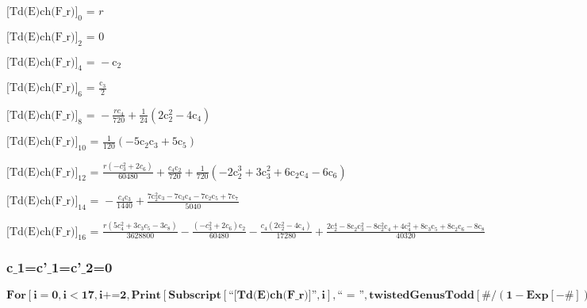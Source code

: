 \documentclass{article}
\newcommand{\unicode}[1]{{}}
\begin{document}
\noindent\(\text{[Td(E)ch(F$\_$r)]}_0\text{ = }r\)

\noindent\(\text{[Td(E)ch(F$\_$r)]}_2\text{ = }0\)

\noindent\(\text{[Td(E)ch(F$\_$r)]}_4\text{ = }-\text{c$\unicode{02bc}$}_2\)

\noindent\(\text{[Td(E)ch(F$\_$r)]}_6\text{ = }\frac{\text{c$\unicode{02bc}$}_3}{2}\)

\noindent\(\text{[Td(E)ch(F$\_$r)]}_8\text{ = }-\frac{r c_4}{720}+\frac{1}{24} \left(2 \text{c$\unicode{02bc}$}_2^2-4 \text{c$\unicode{02bc}$}_4\right)\)

\noindent\(\text{[Td(E)ch(F$\_$r)]}_{10}\text{ = }\frac{1}{120} \left(-5 \text{c$\unicode{02bc}$}_2 \text{c$\unicode{02bc}$}_3+5 \text{c$\unicode{02bc}$}_5\right)\)

\noindent\(\text{[Td(E)ch(F$\_$r)]}_{12}\text{ = }\frac{r \left(-c_3^2+2 c_6\right)}{60480}+\frac{c_4 \text{c$\unicode{02bc}$}_2}{720}+\frac{1}{720}
\left(-2 \text{c$\unicode{02bc}$}_2^3+3 \text{c$\unicode{02bc}$}_3^2+6 \text{c$\unicode{02bc}$}_2 \text{c$\unicode{02bc}$}_4-6 \text{c$\unicode{02bc}$}_6\right)\)

\noindent\(\text{[Td(E)ch(F$\_$r)]}_{14}\text{ = }-\frac{c_4 \text{c$\unicode{02bc}$}_3}{1440}+\frac{7 \text{c$\unicode{02bc}$}_2^2 \text{c$\unicode{02bc}$}_3-7
\text{c$\unicode{02bc}$}_3 \text{c$\unicode{02bc}$}_4-7 \text{c$\unicode{02bc}$}_2 \text{c$\unicode{02bc}$}_5+7 \text{c$\unicode{02bc}$}_7}{5040}\)

\noindent\(\text{[Td(E)ch(F$\_$r)]}_{16}\text{ = }\frac{r \left(5 c_4^2+3 c_3 c_5-3 c_8\right)}{3628800}-\frac{\left(-c_3^2+2 c_6\right) \text{c$\unicode{02bc}$}_2}{60480}-\frac{c_4
\left(2 \text{c$\unicode{02bc}$}_2^2-4 \text{c$\unicode{02bc}$}_4\right)}{17280}+\frac{2 \text{c$\unicode{02bc}$}_2^4-8 \text{c$\unicode{02bc}$}_2
\text{c$\unicode{02bc}$}_3^2-8 \text{c$\unicode{02bc}$}_2^2 \text{c$\unicode{02bc}$}_4+4 \text{c$\unicode{02bc}$}_4^2+8 \text{c$\unicode{02bc}$}_3
\text{c$\unicode{02bc}$}_5+8 \text{c$\unicode{02bc}$}_2 \text{c$\unicode{02bc}$}_6-8 \text{c$\unicode{02bc}$}_8}{40320}\)

\subsubsection*{c$\_$1=c{'}$\_$1=c{'}$\_$2=0}

\begin{doublespace}
\noindent\(\pmb{\text{For}\left[i=0,i<17,i\text{+=}2, \text{Print}\left[\text{Subscript}[\text{{``}[Td(E)ch(F$\_$r)]{''}},i],\text{{``} = {''}},\text{twistedGenusTodd}[\#/(1-\text{Exp}[-\#])\&,i]
\text{/.}c_1\to 0\text{/.}\text{c$\unicode{02bc}$}_1\to 0\text{/.}\text{c$\unicode{02bc}$}_2\to 0\right]\right]}\)
\end{doublespace}
\end{document}
